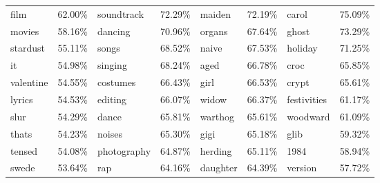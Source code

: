 \documentclass[conference]{IEEEtran}
\begin{document}
\begin{enumerate}
\begin{table}[H]
\begin{tabular}{|llllllll|}
\multicolumn{1}{|l|}{film} & \multicolumn{1}{l|}{62.00\%} & \multicolumn{1}{l|}{soundtrack} & \multicolumn{1}{l|}{72.29\%} & \multicolumn{1}{l|}{maiden} & \multicolumn{1}{l|}{72.19\%} & \multicolumn{1}{l|}{carol} & \multicolumn{1}{l|}{75.09\%} \\
\multicolumn{1}{|l|}{movies} & \multicolumn{1}{l|}{58.16\%} & \multicolumn{1}{l|}{dancing} & \multicolumn{1}{l|}{70.96\%} & \multicolumn{1}{l|}{organs} & \multicolumn{1}{l|}{67.64\%} & \multicolumn{1}{l|}{ghost} & \multicolumn{1}{l|}{73.29\%} \\
\multicolumn{1}{|l|}{stardust} & \multicolumn{1}{l|}{55.11\%} & \multicolumn{1}{l|}{songs} & \multicolumn{1}{l|}{68.52\%} & \multicolumn{1}{l|}{naive} & \multicolumn{1}{l|}{67.53\%} & \multicolumn{1}{l|}{holiday} & \multicolumn{1}{l|}{71.25\%} \\
\multicolumn{1}{|l|}{it} & \multicolumn{1}{l|}{54.98\%} & \multicolumn{1}{l|}{singing} & \multicolumn{1}{l|}{68.24\%} & \multicolumn{1}{l|}{aged} & \multicolumn{1}{l|}{66.78\%} & \multicolumn{1}{l|}{croc} & \multicolumn{1}{l|}{65.85\%} \\
\multicolumn{1}{|l|}{valentine} & \multicolumn{1}{l|}{54.55\%} & \multicolumn{1}{l|}{costumes} & \multicolumn{1}{l|}{66.43\%} & \multicolumn{1}{l|}{girl} & \multicolumn{1}{l|}{66.53\%} & \multicolumn{1}{l|}{crypt} & \multicolumn{1}{l|}{65.61\%} \\
\multicolumn{1}{|l|}{lyrics} & \multicolumn{1}{l|}{54.53\%} & \multicolumn{1}{l|}{editing} & \multicolumn{1}{l|}{66.07\%} & \multicolumn{1}{l|}{widow} & \multicolumn{1}{l|}{66.37\%} & \multicolumn{1}{l|}{festivities} & \multicolumn{1}{l|}{61.17\%} \\
\multicolumn{1}{|l|}{slur} & \multicolumn{1}{l|}{54.29\%} & \multicolumn{1}{l|}{dance} & \multicolumn{1}{l|}{65.81\%} & \multicolumn{1}{l|}{warthog} & \multicolumn{1}{l|}{65.61\%} & \multicolumn{1}{l|}{woodward} & \multicolumn{1}{l|}{61.09\%} \\
\multicolumn{1}{|l|}{thats} & \multicolumn{1}{l|}{54.23\%} & \multicolumn{1}{l|}{noises} & \multicolumn{1}{l|}{65.30\%} & \multicolumn{1}{l|}{gigi} & \multicolumn{1}{l|}{65.18\%} & \multicolumn{1}{l|}{glib} & \multicolumn{1}{l|}{59.32\%} \\
\multicolumn{1}{|l|}{tensed} & \multicolumn{1}{l|}{54.08\%} & \multicolumn{1}{l|}{photography} & \multicolumn{1}{l|}{64.87\%} & \multicolumn{1}{l|}{herding} & \multicolumn{1}{l|}{65.11\%} & \multicolumn{1}{l|}{1984} & \multicolumn{1}{l|}{58.94\%} \\
\multicolumn{1}{|l|}{swede} & \multicolumn{1}{l|}{53.64\%} & \multicolumn{1}{l|}{rap} & \multicolumn{1}{l|}{64.16\%} & \multicolumn{1}{l|}{daughter} & \multicolumn{1}{l|}{64.39\%} & \multicolumn{1}{l|}{version} & \multicolumn{1}{l|}{57.72\%} \\ \hline

\end{tabular}
\end{table}
\end{enumerate}
\end{document}
